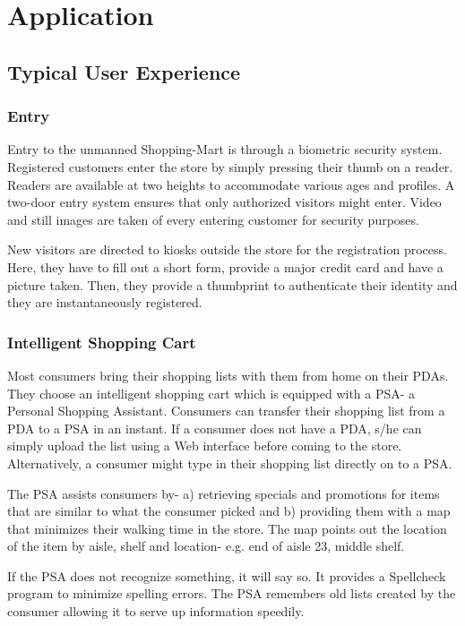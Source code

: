 \documentclass[a4paper,oneside,11pt,english]{report}
\begin{document}
\chapter{Application}
\section{Typical User Experience}

	\subsection{Entry}
	\par Entry to the unmanned Shopping-Mart is through a biometric security system.  Registered customers enter the store by simply pressing their thumb on a reader.  Readers are available at two heights to accommodate various ages and profiles.  A two-door entry system ensures that only authorized visitors might enter.  Video and still images are taken of every entering customer for security purposes.   
	\par New visitors are directed to kiosks outside the store for the registration process.  Here, they have to fill out a short form, provide a major credit card and have a picture taken.  Then, they provide a thumbprint to authenticate their identity and they are instantaneously registered. 
	
	
	
	
	\subsection{Intelligent Shopping Cart }
	
	Most consumers bring their shopping lists with them from home on their PDAs.  They choose an intelligent shopping cart which is equipped with a PSA- a Personal Shopping Assistant.  Consumers can transfer their shopping list from a PDA to a PSA in an instant.  If a consumer does not have a PDA, s/he can simply upload the list using a Web interface before coming to the store.  Alternatively, a consumer might type in their shopping list directly on to a PSA. 
	\par The PSA assists consumers by- a) retrieving specials and promotions for items that are similar to what the consumer picked and b) providing them with a map that minimizes their walking time in the store.  The map points out the location of the item by aisle, shelf and location- e.g. end of aisle 23, middle shelf.     
	\par If the PSA does not recognize something, it will say so.  It provides a Spellcheck program to minimize spelling errors.  The PSA remembers old lists created by the consumer allowing it to serve up information speedily. 
	
\end{document}
